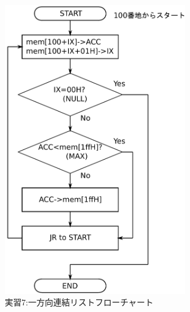 \documentclass[dvipdfmx]{jsarticle}
\begin{document}
\begin{figure}[h]
  \centering
  \includegraphics[width=8cm]{7_list_flow.pdf}
  \caption{実習7:一方向連結リストフローチャート}
  \label{fig:7_list_flow}
\end{figure}
\end{document}
